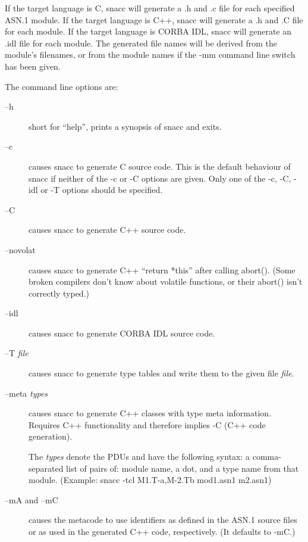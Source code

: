 If the target language is C, snacc will generate a {\ufn .h} and {\ufn .c} file for each specified ASN.1 module.
If the target language is C++, snacc will generate a {\ufn .h} and {\ufn .C} file for each module.
If the target language is CORBA IDL, snacc will generate an {\ufn .idl} file for each module.
The generated file names will be derived from the module's filenames, or from the
module names if the {\ufn -mm} command line switch has been given.

The command line options are:

\begin{description}
  \item[--h    ] {short for ``help'', prints a synopsis of snacc and exits.}

  \item[--c    ] {causes snacc to generate C source code.
  This is the default behaviour of snacc if neither of the {\ufn -c} or {\ufn -C} options are given.
  Only one of the {\ufn -c}, {\ufn -C}, {\ufn -idl} or {\ufn -T} options should be specified.}

  \item[--C    ] {causes snacc to generate C++ source code.}

  \item[--novolat] {causes snacc to generate C++ ``{\C return *this}''
  after calling {\C abort()}. (Some broken compilers don't know about
  volatile functions, or their abort() isn't correctly typed.)}

  \item[--idl  ] {causes snacc to generate CORBA IDL source code.}

  \item[--T \emph{file}] {causes snacc to generate type tables and write them to the given file \emph{file}.}

  \item[--meta \emph{types}]
    causes snacc to generate C++ classes with type meta information.
    Requires C++ functionality and therefore implies {\ufn -C} (C++ code generation).

  The \emph{types} denote the PDUs and have the following syntax: a comma-separated list of pairs of: module name, a dot, and a type name from that module. (Example: {\ufn snacc -tcl M1.T-a,M-2.Tb mod1.asn1 m2.asn1})

  \item[--mA \textnormal{and} --mC]
    causes the metacode to use identifiers as defined in the ASN.1 source files or as used in the generated C++ code, respectively.
    (It defaults to {\ufn -mC}.)


\end{description}

